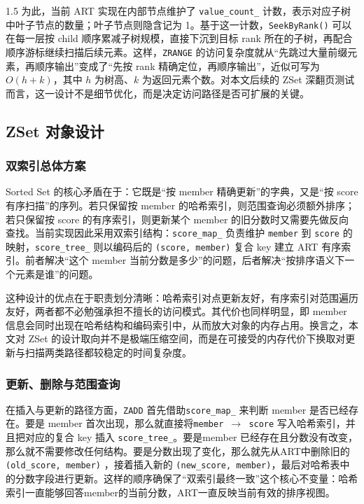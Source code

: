 \documentclass[a4paper,12pt,fontset=none,twoside]{article}
\numberwithin{figure}{section}
\numberwithin{equation}{section}
\numberwithin{table}{section}
\begin{document}
\begin{spacing}{1.5}
	为此，当前 ART 实现在内部节点维护了 \texttt{value\_count\_} 计数，表示对应子树中叶子节点的数量；叶子节点则隐含记为 1。基于这一计数，\texttt{SeekByRank()} 可以在每一层按 child 顺序累减子树规模，直接下沉到目标 rank 所在的子树，再配合顺序游标继续扫描后续元素。这样，\texttt{ZRANGE} 的访问复杂度就从“先跳过大量前缀元素，再顺序输出”变成了“先按 rank 精确定位，再顺序输出”，近似可写为 $O(h + k)$，其中 $h$ 为树高、$k$ 为返回元素个数。对本文后续的 ZSet 深翻页测试而言，这一设计不是细节优化，而是决定访问路径是否可扩展的关键。

	\subsection{ZSet 对象设计}

	\subsubsection{双索引总体方案}

	Sorted Set 的核心矛盾在于：它既是“按 member 精确更新”的字典，又是“按 score 有序扫描”的序列。若只保留按 member 的哈希索引，则范围查询必须额外排序；若只保留按 score 的有序索引，则更新某个 member 的旧分数时又需要先做反向查找。当前实现因此采用双索引结构：\texttt{score\_map\_} 负责维护 \texttt{member} 到 \texttt{score} 的映射，\texttt{score\_tree\_} 则以编码后的 \texttt{(score, member)} 复合 key 建立 ART 有序索引。前者解决“这个 member 当前分数是多少”的问题，后者解决“按排序语义下一个元素是谁”的问题。

	这种设计的优点在于职责划分清晰：哈希索引对点更新友好，有序索引对范围遍历友好，两者都不必勉强承担不擅长的访问模式。其代价也同样明显，即 member 信息会同时出现在哈希结构和编码索引中，从而放大对象的内存占用。换言之，本文对 ZSet 的设计取向并不是极端压缩空间，而是在可接受的内存代价下换取对更新与扫描两类路径都较稳定的时间复杂度。

	\subsubsection{更新、删除与范围查询}

	在插入与更新的路径方面，\texttt{ZADD} 首先借助\texttt{score\_map\_} 来判断 member 是否已经存在。要是 member 首次出现，那么就直接将\texttt{member $\rightarrow$ score} 写入哈希索引，并且把对应的复合 key 插入 \texttt{score\_tree\_}。要是member 已经存在且分数没有改变，那么就不需要修改任何结构。要是分数出现了变化，那么就先从ART中删除旧的 \texttt{(old\_score, member)} ，接着插入新的 \texttt{(new\_score, member)}，最后对哈希表中的分数字段进行更新。这样的顺序确保了“双索引最终一致”这个核心不变量：哈希索引一直能够回答member的当前分数，ART一直反映当前有效的排序视图。


\end{spacing}
\end{document}
